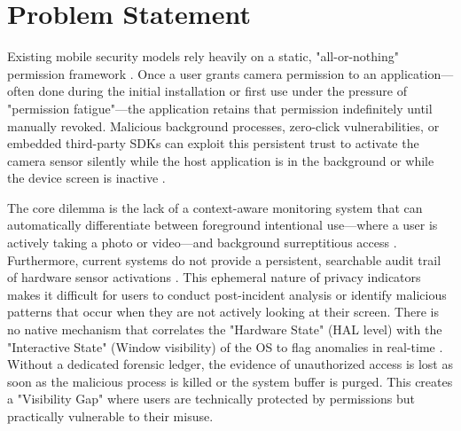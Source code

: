\documentclass[12pt,a4paper]{report}
\begin{document}
\begin{enumerate}
    \end{enumerate}
    \section{Problem Statement}
    Existing mobile security models rely heavily on a static, "all-or-nothing" permission framework \cite{malwaresurvey}. Once a user grants camera permission to an application—often done during the initial installation or first use under the pressure of "permission fatigue"—the application retains that permission indefinitely until manually revoked. Malicious background processes, zero-click vulnerabilities, or embedded third-party SDKs can exploit this persistent trust to activate the camera sensor silently while the host application is in the background or while the device screen is inactive \cite{taintdroid}.

    The core dilemma is the lack of a context-aware monitoring system that can automatically differentiate between foreground intentional use—where a user is actively taking a photo or video—and background surreptitious access \cite{snooperstop}. Furthermore, current systems do not provide a persistent, searchable audit trail of hardware sensor activations \cite{smarthome}. This ephemeral nature of privacy indicators makes it difficult for users to conduct post-incident analysis or identify malicious patterns that occur when they are not actively looking at their screen. There is no native mechanism that correlates the "Hardware State" (HAL level) with the "Interactive State" (Window visibility) of the OS to flag anomalies in real-time \cite{androidhal}. Without a dedicated forensic ledger, the evidence of unauthorized access is lost as soon as the malicious process is killed or the system buffer is purged. This creates a "Visibility Gap" where users are technically protected by permissions but practically vulnerable to their misuse.
\end{document}
